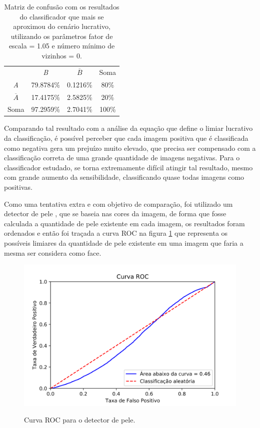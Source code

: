  \begin{table}[htbp]
     \caption{Matriz de confusão com os resultados do classificador que mais se aproximou do cenário lucrativo, utilizando os parâmetros fator de escala = 1.05 e número mínimo de vizinhos = 0.}
     \label{tab:matriz_de_confusao_best_result}
     \centering
     \begin{tabular}{cccc}\hline\hline
         & \textit{B} & $\overline{B}$ & Soma\\
     \textit{A} & 79.8784\% & 0.1216\% & 80\% \\
     $\overline{A}$ & 17.4175\% & 2.5825\% & 20\% \\
     Soma & 97.2959\% & 2.7041\% & 100\% \\
     \hline\hline
     \end{tabular}
 \end{table}

Comparando tal resultado com a análise da equação que define o limiar lucrativo da classificação, é possível perceber que cada imagem positiva que é classificada como negativa gera um prejuízo muito elevado, que precisa ser compensado com a classificação correta de uma grande quantidade de imagens negativas. Para o classificador estudado, se torna extremamente difícil atingir tal resultado, mesmo com grande aumento da sensibilidade, classificando quase todas imagens como positivas.

Como uma tentativa extra e com objetivo de comparação, foi utilizado um detector de pele \cite{skin_rosebrock_2018}, que se baseia nas cores da imagem, de forma que fosse calculada a quantidade de pele existente em cada imagem, os resultados foram ordenados e então foi traçada a curva ROC na figura \ref{fig:skin_roc} que representa os possíveis limiares da quantidade de pele existente em uma imagem que faria a mesma ser considera como face.

\begin{figure}[htbp]
     \centering
     \caption{Curva ROC para o detector de pele.}
     \includegraphics[scale=1]{figs/curva_roc_skin.png}
     \label{fig:skin_roc}
 \end{figure}

